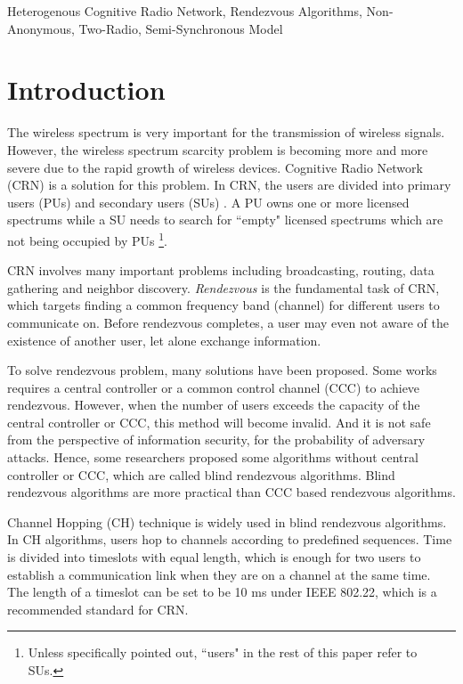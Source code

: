 \documentclass[10pt, conference, letterpaper]{IEEEtran}
\begin{document}
\begin{IEEEkeywords}
Heterogenous Cognitive Radio Network, Rendezvous Algorithms, Non-Anonymous, Two-Radio, Semi-Synchronous Model
\end{IEEEkeywords}

\section{Introduction}
The wireless spectrum is very important for the transmission of wireless signals. However, the wireless spectrum scarcity problem is becoming more and more severe due to the rapid growth of wireless devices. Cognitive Radio Network (CRN) is a solution for this problem. In CRN, the users are divided into primary users (PUs) and secondary users (SUs) . A PU owns one or more licensed spectrums while a SU needs to search for ``empty" licensed spectrums which are not being occupied by PUs \footnote{Unless specifically pointed out, ``users" in the rest of this paper refer to SUs.}.

CRN involves many important problems including broadcasting, routing, data gathering and neighbor discovery. \emph{Rendezvous} is the fundamental task of CRN, which targets finding a common frequency band (channel) for different users to communicate on. Before rendezvous completes, a user may even not aware of the existence of another user, let alone exchange information.

To solve rendezvous problem, many solutions have been proposed. Some works requires a central controller or a common control channel (CCC) to achieve rendezvous. However, when the number of users exceeds the capacity of the central controller or CCC, this method will become invalid. And it is not safe from the perspective of information security, for the probability of adversary attacks. Hence, some researchers proposed some algorithms without central controller or CCC, which are called blind rendezvous algorithms. Blind rendezvous algorithms are more practical than CCC based rendezvous algorithms.

Channel Hopping (CH) technique is widely used in blind rendezvous algorithms. In CH algorithms, users hop to channels according to predefined sequences. Time is divided into timeslots with equal length, which is enough for two users to establish a communication link when they are on a channel at the same time. The length of a timeslot can be set to be 10 ms under IEEE 802.22, which is a recommended standard for CRN.
\end{document}
